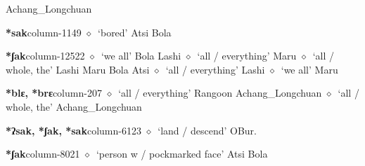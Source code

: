          Achang\_Longchuan 
  \item {\footnotesize \textbf{*sak}}{\tiny column-1149}
         $\diamond$~`bored'
         Atsi 
\hspace{1ex}
         Bola 
  \item {\footnotesize \textbf{*ʃak}}{\tiny column-12522}
         $\diamond$~`we all'
         Bola 
\hspace{1ex}
         Lashi 
\hspace{1ex}
         $\diamond$~`all / everything'
         Maru 
\hspace{1ex}
         $\diamond$~`all / whole, the'
         Lashi 
\hspace{1ex}
         Maru 
\hspace{1ex}
         Bola 
\hspace{1ex}
         Atsi 
\hspace{1ex}
         $\diamond$~`all / everything'
         Lashi 
\hspace{1ex}
         $\diamond$~`we all'
         Maru 
  \item {\footnotesize \textbf{*blɛ, *brɛ}}{\tiny column-207}
         $\diamond$~`all / everything'
         Rangoon 
\hspace{1ex}
         Achang\_Longchuan 
\hspace{1ex}
         $\diamond$~`all / whole, the'
         Achang\_Longchuan 
  \item {\footnotesize \textbf{*ʔsak, *ʃak, *sak}}{\tiny column-6123}
         $\diamond$~`land / descend'
         OBur. 
  \item {\footnotesize \textbf{*ʃak}}{\tiny column-8021}
         $\diamond$~`person w / pockmarked face'
         Atsi 
\hspace{1ex}
         Bola 
\hspace{1ex}
